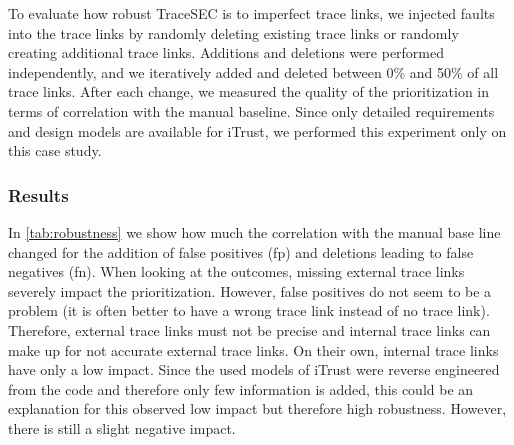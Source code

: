 	To evaluate how robust TraceSEC is to imperfect trace links, we injected faults into the trace links by randomly deleting existing trace links or randomly creating additional trace links.
	Additions and deletions were performed independently, and we iteratively added and deleted between 0\% and 50\% of all trace links.
	After each change, we measured the quality of the prioritization in terms of correlation with the manual baseline.
	Since only detailed requirements and design models are available for iTrust, we performed this experiment only on this case study.



\subsubsection{Results}
%
	In  \autoref{tab:robustness} we show how much the correlation with the manual base line changed for the addition of false positives (fp) and deletions leading to false negatives (fn).
	When looking at the outcomes, missing external trace links severely impact the prioritization. However, false positives do not seem to be a  problem (it is often better to have a wrong trace link instead of no trace link).
	Therefore, external trace links must not be precise and internal trace links can make up for not accurate external trace links.
	On their own, internal trace links have only a low impact.
	Since the used models of iTrust were reverse engineered from the code and therefore only few information is added, this could be an explanation for this observed low impact but therefore high robustness.
	However, there is still a slight negative impact.

